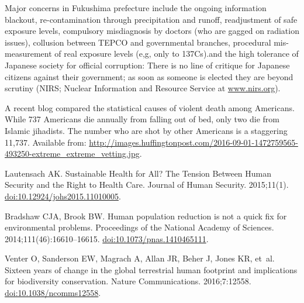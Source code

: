 \documentclass[10pt,a4paper]{article}
\begin{document}
\begin{multicols}{2}
\begin{footnotesize}
\begin{thebibliography}{10}
Major concerns in Fukushima prefecture include the ongoing information
  blackout, re-contamination through precipitation and runoff, readjustment of
  safe exposure levels, compulsory misdiagnosis by doctors (who are gagged on
  radiation issues), collusion between TEPCO and governmental branches,
  procedural mis-measurement of real exposure levels (e,g, only to 137Cs).and
  the high tolerance of Japanese society for official corruption: There is no
  line of critique for Japanese citizens against their government; as soon as
  someone is elected they are beyond scrutiny (NIRS; Nuclear Information and
  Resource Service at \url{www.nirs.org}).

A recent blog compared the statistical causes of violent death among Americans.
  While 737 Americans die annually from falling out of bed, only two die from
  Islamic jihadists. The number who are shot by other Americans is a staggering
  11,737. Available from:
  \url{http://images.huffingtonpost.com/2016-09-01-1472759565-493250-extreme_extreme_vetting.jpg}.

Lautensach AK.
\newblock Sustainable Health for All? The Tension Between Human Security and
  the Right to Health Care.
\newblock Journal of Human Security. 2015;11(1).
\newblock
  \href{https://doi.org/10.12924/johs2015.11010005}{doi:10.12924/johs2015.11010005}.

Bradshaw CJA, Brook BW.
\newblock Human population reduction is not a quick fix for environmental
  problems.
\newblock Proceedings of the National Academy of Sciences.
  2014;111(46):16610--16615.
\newblock
  \href{https://doi.org/10.1073/pnas.1410465111}{doi:10.1073/pnas.1410465111}.

Venter O, Sanderson EW, Magrach A, Allan JR, Beher J, Jones KR, et~al.
\newblock Sixteen years of change in the global terrestrial human footprint and
  implications for biodiversity conservation.
\newblock Nature Communications. 2016;7:12558.
\newblock \href{https://doi.org/10.1038/ncomms12558}{doi:10.1038/ncomms12558}.

\end{thebibliography}


\end{footnotesize}

\end{multicols}
\end{document}
